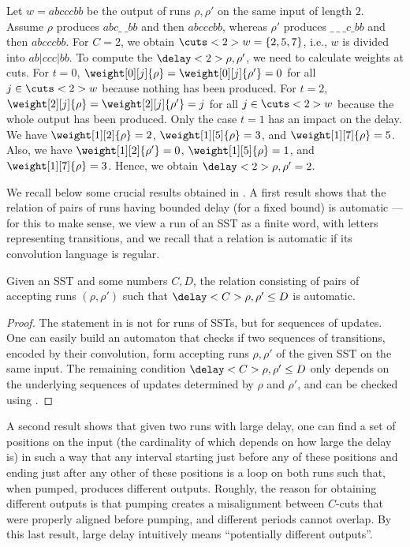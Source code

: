 \documentclass{article}
\begin{document}
\begin{example}\label{ex:delay}
Let $w = abcccbb$ be the output of runs $\rho, \rho'$ 
on the same input of length $2$. 
Assume $\rho$ produces $abc\_\ \_bb$ and then $abcccbb$, 
whereas $\rho'$ produces $\_\ \_\ \_c\_bb$ and then $abcccbb$.
For $C = 2$, we obtain $\cuts<2>{w} = \{2,5,7\}$, i.e., $w$ is divided into $ab|ccc|bb$.
To compute the $\delay<2>{\rho,\rho'}$, we need to calculate weights
at cuts. For $t=0$, $\weight[0][j]{\rho} =
\weight[0][j]{\rho'} = 0$ for all $j\in \cuts<2>{w}$ because nothing
has been produced. For $t=2$, $\weight[2][j]{\rho} =
\weight[2][j]{\rho'} = j$ for all $j\in \cuts<2>{w}$ because the whole output
has been produced. Only the case $t=1$ has an impact on the delay. 
We have $\weight[1][2]{\rho} = 2$, $\weight[1][5]{\rho} = 3$, and $\weight[1][7]{\rho} = 5$.
Also, we have $\weight[1][2]{\rho'} = 0$, $\weight[1][5]{\rho} = 1$, and $\weight[1][7]{\rho} = 3$.
Hence, we obtain $\delay<2>{\rho,\rho'} = 2$. 
\end{example}

We recall below some crucial results obtained in \cite{SSTdelay}.
A first result shows that the relation of pairs of runs 
having bounded delay (for a fixed bound) is automatic
--- for this to make sense, we view a run of an SST
as a finite word, with letters representing transitions, 
and we recall that a relation is automatic 
if its convolution language is regular.


\begin{lemma}\label{lem:regular-delay}
Given an SST and some numbers $C,D$, the relation consisting of
pairs of accepting runs $(\rho,\rho')$ such that $\delay<C>{\rho,\rho'} \le D$ 
is automatic.
\end{lemma}

\begin{proof}
The statement in \cite[Theorem 5]{SSTdelay} is not for runs of SSTs,
but for sequences of updates. One can easily build an automaton 
that checks if two sequences of transitions, encoded by their convolution,
form accepting runs $\rho,\rho'$ of the given SST on the same input. 
The remaining condition $\delay<C>{\rho,\rho'} \le D$ only depends on 
the underlying sequences of updates determined by $\rho$ and $\rho'$,
and can be checked using \cite[Theorem 5]{SSTdelay}.
\end{proof}


A second result shows that given two runs with large
delay, one can find a set of positions on the input 
(the cardinality of which depends on how large the delay is)
in such a way that any interval starting just before any of 
these positions and ending just after any other of these positions 
is a loop on both runs such that, when pumped, produces 
different outputs. 
Roughly, the reason for obtaining different outputs is that pumping creates a misalignment between $C$-cuts that were properly aligned before pumping, and different periods cannot overlap.
By this last result, large delay intuitively means 
``potentially different outputs''.
\end{document}
